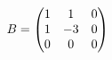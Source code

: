 \documentclass[preview]{standalone}
\begin{document}
\begin{align*}
\special{dvisvgm:raw <g id='unique000'>}B=\begin{pmatrix}1&1&0\\1&-3&0\\0&0&0\end{pmatrix}\special{dvisvgm:raw </g>}
\end{align*}
\end{document}
